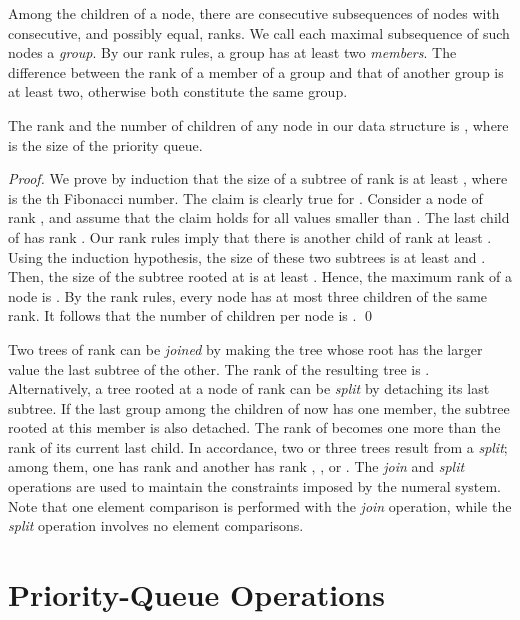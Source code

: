 \documentclass{llncs}
\begin{document}
Among the children of a node, there are consecutive subsequences of
nodes with consecutive, and possibly equal, ranks.  We call each
maximal subsequence of such nodes a \emph{group}.  By our rank rules,
a group has at least two \emph{members}.  The difference between the
rank of a member of a group and that of another group is at least two,
otherwise both constitute the same group.

\begin{lemma}
\label{log}
The rank and the number of children of any node in our data structure is
, where  is the size of the priority queue.
\end{lemma}

\begin{proof}
We prove by induction that the size of a subtree of rank  is at
least , where  is the th Fibonacci number. The claim
is clearly true for .  Consider a node  of rank , and assume that the claim holds for all values smaller than
. The last child of  has rank . Our rank rules imply
that there is another child of rank at least . Using the
induction hypothesis, the size of these two subtrees is at least
 and .  Then, the size of the subtree rooted
at  is at least .  
Hence, the maximum rank of a node is . 
By the rank rules, every node has at most three children of the same rank. 
It follows that the number of children per node is .
\qed
\end{proof}

Two trees of rank  can be \emph{joined} by making the tree whose
root has the larger value the last subtree of the other. The rank of
the resulting tree is .  Alternatively, a tree rooted at a node
 of rank  can be \emph{split} by detaching its last subtree.
If the last group among the children of  now has one member, the
subtree rooted at this member is also detached.  The rank of 
becomes one more than the rank of its current last child. In
accordance, two or three trees result from a {\it split}; among them, one
has rank  and another has rank , , or .  The {\it join} and
{\it split} operations are used to maintain the constraints imposed by the
numeral system.  Note that one element comparison is performed with
the {\it join} operation, while the {\it split} operation involves no element
comparisons.


\section{Priority-Queue Operations}
\end{document}
